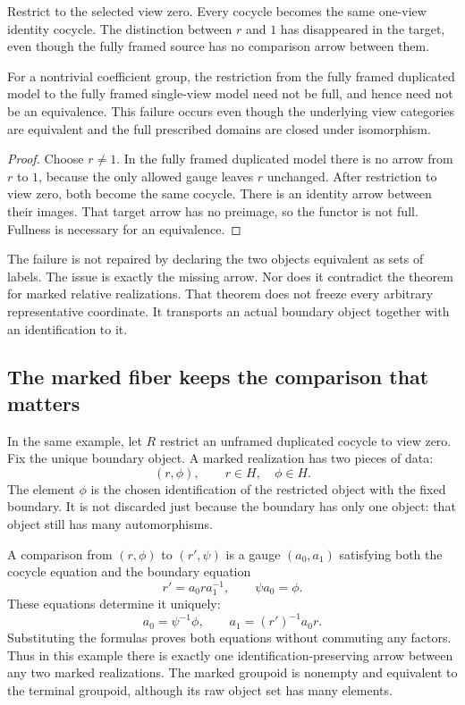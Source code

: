 Restrict to the selected view zero. Every cocycle becomes the same one-view identity cocycle. The distinction between \(r\) and \(1\) has disappeared in the target, even though the fully framed source has no comparison arrow between them.

\begin{KSproposition}\label{KS:KS68}
For a nontrivial coefficient group, the restriction from the fully framed duplicated model to the fully framed single-view model need not be full, and hence need not be an equivalence. This failure occurs even though the underlying view categories are equivalent and the full prescribed domains are closed under isomorphism.
\end{KSproposition}
\begin{proof}
Choose \(r\ne1\). In the fully framed duplicated model there is no arrow from \(r\) to \(1\), because the only allowed gauge leaves \(r\) unchanged. After restriction to view zero, both become the same cocycle. There is an identity arrow between their images. That target arrow has no preimage, so the functor is not full. Fullness is necessary for an equivalence.
\end{proof}
The failure is not repaired by declaring the two objects equivalent as sets of labels. The issue is exactly the missing arrow. Nor does it contradict the theorem for marked relative realizations. That theorem does not freeze every arbitrary representative coordinate. It transports an actual boundary object together with an identification to it.

\subsection{The marked fiber keeps the comparison that matters}
In the same example, let \(R\) restrict an unframed duplicated cocycle to view zero. Fix the unique boundary object. A marked realization has two pieces of data:
\[
 (r,\phi),\qquad r\in H,\quad\phi\in H.
\]
The element \(\phi\) is the chosen identification of the restricted object with the fixed boundary. It is not discarded just because the boundary has only one object: that object still has many automorphisms.

A comparison from \((r,\phi)\) to \((r',\psi)\) is a gauge \((a_0,a_1)\) satisfying both the cocycle equation and the boundary equation
\[
 r'=a_0ra_1^{-1},\qquad \psi a_0=\phi.
\]
These equations determine it uniquely:
\begin{equation}\label{KS:eq:marked-two-copy}
 a_0=\psi^{-1}\phi,\qquad a_1=(r')^{-1}a_0r.
\end{equation}
Substituting the formulas proves both equations without commuting any factors. Thus in this example there is exactly one identification-preserving arrow between any two marked realizations. The marked groupoid is nonempty and equivalent to the terminal groupoid, although its raw object set has many elements.

